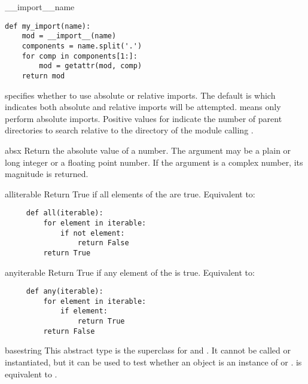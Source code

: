 \begin{funcdesc}{__import__}{name}
\begin{verbatim}
def my_import(name):
    mod = __import__(name)
    components = name.split('.')
    for comp in components[1:]:
        mod = getattr(mod, comp)
    return mod
\end{verbatim}

   specifies whether to use absolute or relative imports.
  The default is  which indicates both absolute and relative
  imports will be attempted.   means only perform absolute imports.
  Positive values for  indicate the number of parent directories
  to search relative to the directory of the module calling
  .
\end{funcdesc}

\begin{funcdesc}{abs}{x}
  Return the absolute value of a number.  The argument may be a plain
  or long integer or a floating point number.  If the argument is a
  complex number, its magnitude is returned.
\end{funcdesc}

\begin{funcdesc}{all}{iterable}
  Return True if all elements of the  are true.
  Equivalent to:
  \begin{verbatim}
     def all(iterable):
         for element in iterable:
             if not element:
                 return False
         return True
  \end{verbatim}
\end{funcdesc}

\begin{funcdesc}{any}{iterable}
  Return True if any element of the  is true.
  Equivalent to:
  \begin{verbatim}
     def any(iterable):
         for element in iterable:
             if element:
                 return True
         return False
  \end{verbatim}
\end{funcdesc}

\begin{funcdesc}{basestring}{}
  This abstract type is the superclass for  and .
  It cannot be called or instantiated, but it can be used to test whether
  an object is an instance of  or .
   is equivalent to
  .
\end{funcdesc}


